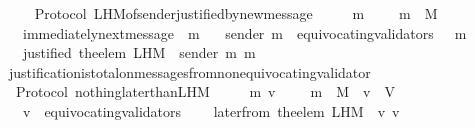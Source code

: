 \begin{isabellebody}
%
\isadelimproof
\ \ %
\endisadelimproof
%
\isatagproof
{}\isamarkupfalse%
%
\endisatagproof
{\isafoldproof}%
%
\isadelimproof
\isanewline
%
\endisadelimproof
\isanewline
\isanewline
\isanewline
{}\isamarkupfalse%
\ {\isacharparenleft}\ Protocol{\isacharparenright}\ L{\isacharunderscore}H{\isacharunderscore}M{\isacharunderscore}of{\isacharunderscore}sender{\isacharunderscore}justified{\isacharunderscore}by{\isacharunderscore}new{\isacharunderscore}message\ {\isacharcolon}\isanewline
\ \ {\isachardoublequoteopen}{\isasymforall}\ {\isasymsigma}\ m{\isachardot}\ {\isasymsigma}\ {\isasymin}\ {\isasymSigma}\ {\isasymand}\ m\ {\isasymin}\ M\ \isanewline
\ \ {\isasymlongrightarrow}\ immediately{\isacharunderscore}next{\isacharunderscore}message\ {\isacharparenleft}{\isasymsigma}{\isacharcomma}\ m{\isacharparenright}\isanewline
\ \ {\isasymlongrightarrow}\ sender\ m\ {\isasymnotin}\ equivocating{\isacharunderscore}validators\ {\isacharparenleft}{\isasymsigma}\ {\isasymunion}\ {\isacharbraceleft}m{\isacharbraceright}{\isacharparenright}\isanewline
\ \ {\isasymlongrightarrow}\ justified\ {\isacharparenleft}the{\isacharunderscore}elem\ {\isacharparenleft}L{\isacharunderscore}H{\isacharunderscore}M\ {\isasymsigma}\ {\isacharparenleft}sender\ m{\isacharparenright}{\isacharparenright}{\isacharparenright}\ m{\isachardoublequoteclose}\isanewline
\ \ \isanewline
%
\isadelimproof
\ \ %
\endisadelimproof
%
\isatagproof
{}\isamarkupfalse%
\ justification{\isacharunderscore}is{\isacharunderscore}total{\isacharunderscore}on{\isacharunderscore}messages{\isacharunderscore}from{\isacharunderscore}non{\isacharunderscore}equivocating{\isacharunderscore}validator\isanewline
\ \ \isamarkupfalse%
%
\endisatagproof
{\isafoldproof}%
%
\isadelimproof
\isanewline
%
\endisadelimproof
\isanewline
\isanewline
{}\isamarkupfalse%
\ {\isacharparenleft}\ Protocol{\isacharparenright}\ nothing{\isacharunderscore}later{\isacharunderscore}than{\isacharunderscore}L{\isacharunderscore}H{\isacharunderscore}M\ {\isacharcolon}\isanewline
\ \ {\isachardoublequoteopen}{\isasymforall}\ {\isasymsigma}\ m\ v{\isachardot}\ {\isasymsigma}\ {\isasymin}\ {\isasymSigma}\ {\isasymand}\ m\ {\isasymin}\ M\ {\isasymand}\ v\ {\isasymin}\ V\isanewline
\ \ {\isasymlongrightarrow}\ v\ {\isasymnotin}\ equivocating{\isacharunderscore}validators\ {\isasymsigma}\isanewline
\ \ {\isasymlongrightarrow}\ later{\isacharunderscore}from\ {\isacharparenleft}the{\isacharunderscore}elem\ {\isacharparenleft}L{\isacharunderscore}H{\isacharunderscore}M\ {\isasymsigma}\ v{\isacharparenright}{\isacharcomma}\ v{\isacharcomma}\ {\isasymsigma}{\isacharparenright}\ {\isacharequal}\ {\isasymemptyset}{\isachardoublequoteclose}\isanewline

\end{isabellebody}
